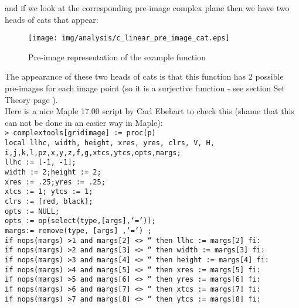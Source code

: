 	\begin{tcolorbox}[colframe=black,colback=white,sharp corners]
and if we look at the corresponding pre-image complex plane  then we have two heads of cats that appear:
	\begin{figure}[H]
		\begin{center}
			\texttt{[image: img/analysis/c\_linear\_pre\_image\_cat.eps]}
		\end{center}	
		\caption{Pre-image representation of the example function}
	\end{figure}
The appearance of these two heads of cats is that this function has 2 possible pre-images for each image point (so it is a surjective function - see section Set Theory page \pageref{surjective application}).\\

Here is a nice Maple 17.00 script by Carl Ebehart to check this (shame that this can not be done in an easier way in Maple):\\

\texttt{> complextools[gridimage] := proc(p)\\
local llhc, width, height, xres, yres, clrs, V, H, i,j,k,l,pz,x,y,z,f,g,xtcs,ytcs,opts,margs;\\
llhc := [-1, -1];\\
width := 2;height := 2;\\
xres := .25;yres := .25;\\
xtcs := 1; ytcs := 1;\\
clrs := [red, black];\\
opts := NULL;\\
opts := op(select(type,[args],`=`));\\
margs:= remove(type, [args] ,`=`) ;\\
if nops(margs) >1 and margs[2] <> `` then llhc := margs[2] fi:\\
if nops(margs) >2 and margs[3] <> `` then width := margs[3] fi:\\
if nops(margs) >3 and margs[4] <> `` then height := margs[4] fi:\\
if nops(margs) >4 and margs[5] <> `` then xres := margs[5] fi:\\
if nops(margs) >5 and margs[6] <> `` then yres := margs[6] fi:\\
if nops(margs) >6 and margs[7] <> `` then xtcs := margs[7] fi:\\
if nops(margs) >7 and margs[8] <> `` then ytcs := margs[8] fi:}
	\end{tcolorbox}

